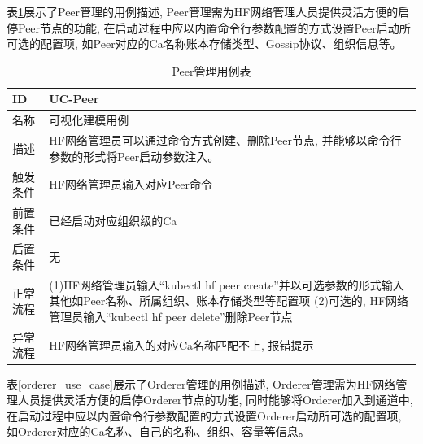 表\ref{peer_use_case}展示了Peer管理的用例描述, Peer管理需为HF网络管理人员提供灵活方便的启停Peer节点的功能, 在启动过程中应以内置命令行参数配置的方式设置Peer启动所可选的配置项, 如Peer对应的Ca名称账本存储类型、Gossip协议、组织信息等。

{\footnotesize
\begin{longtable}[h]{m{60pt}|m{280pt}}
    \caption[Peer管理用例表]{Peer管理用例表} \label{peer_use_case} \\
        \hline  
        ID&UC-Peer\\
        \hline
        名称&可视化建模用例\\
        \hline
        描述&HF网络管理员可以通过命令方式创建、删除Peer节点, 并能够以命令行参数的形式将Peer启动参数注入。\\
        \hline
        触发条件&HF网络管理员输入对应Peer命令\\
        \hline
        前置条件&已经启动对应组织级的Ca\\
        \hline
        后置条件&无\\
        \hline
        正常流程& (1)HF网络管理员输入“kubectl hf peer create”并以可选参数的形式输入其他如Peer名称、所属组织、账本存储类型等配置项
        \newline (2)可选的, HF网络管理员输入“kubectl hf peer delete”删除Peer节点 \\
        \hline
        异常流程& HF网络管理员输入的对应Ca名称匹配不上, 报错提示\\
        \hline
    \end{longtable} 
}

表\ref{orderer_use_case}展示了Orderer管理的用例描述, Orderer管理需为HF网络管理人员提供灵活方便的启停Orderer节点的功能, 同时能够将Orderer加入到通道中,在启动过程中应以内置命令行参数配置的方式设置Orderer启动所可选的配置项, 如Orderer对应的Ca名称、自己的名称、组织、容量等信息。



